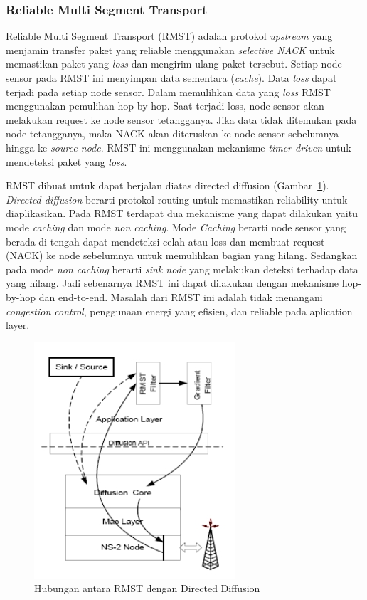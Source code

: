\subsubsection{Reliable Multi Segment Transport}
Reliable Multi Segment Transport (RMST) adalah protokol \textit{upstream} yang menjamin transfer paket yang reliable menggunakan \textit{selective NACK} untuk memastikan paket yang \textit{loss} dan mengirim ulang paket tersebut. Setiap node sensor pada RMST ini menyimpan data sementara (\textit{cache}). Data \textit{loss} dapat terjadi pada setiap node sensor. Dalam memulihkan data yang \textit{loss} RMST menggunakan pemulihan hop-by-hop. Saat terjadi loss, node sensor akan melakukan request ke node sensor tetangganya. Jika data tidak ditemukan pada node tetangganya, maka NACK akan diteruskan ke node sensor sebelumnya hingga ke \textit{source node}. RMST ini menggunakan mekanisme \textit{timer-driven} untuk mendeteksi paket yang \textit{loss}. 

RMST dibuat untuk dapat berjalan diatas directed diffusion (Gambar~\ref{fig:directed_diffusion}). \textit{Directed diffusion} berarti protokol routing untuk memastikan reliability untuk diaplikasikan. Pada RMST terdapat dua mekanisme yang dapat dilakukan yaitu mode \textit{caching} dan mode \textit{non caching}. Mode \textit{Caching} berarti node sensor yang berada di tengah dapat mendeteksi celah atau loss dan membuat request (NACK) ke node sebelumnya untuk memulihkan bagian yang hilang. Sedangkan pada mode \textit{non caching} berarti \textit{sink node} yang melakukan deteksi terhadap data yang hilang. Jadi sebenarnya RMST ini dapat dilakukan dengan mekanisme hop-by-hop dan end-to-end. Masalah dari RMST ini adalah tidak menangani \textit{congestion control}, penggunaan energi yang efisien, dan reliable pada aplication layer.
\begin{figure} [H]
	\centering  
	\includegraphics[scale=1]{Gambar/directed_diffusion}  
	\caption[Hubungan antara RMST dengan Directed Diffusion]{Hubungan antara RMST dengan Directed Diffusion} 
	\label{fig:directed_diffusion} 
\end{figure} 


